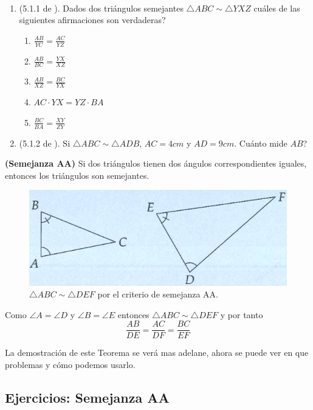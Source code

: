 \begin{exer}{\ \\}
	\begin{enumerate} 
		\item (5.1.1 de \cite{Aops_Geometria}). Dados dos triángulos semejantes $\triangle ABC \sim \triangle YXZ$ cuáles de las siguientes afirmaciones son verdaderas?
		\begin{enumerate}[label=\Alph*)]
			\item $\frac{AB}{YC}=\frac{AC}{YZ}$
			\item$\frac{AB}{BC}=\frac{YX}{XZ}$
			\item $\frac{AB}{XZ}=\frac{BC}{YX}$
			\item $AC\cdot YX = YZ \cdot BA$
			\item $\frac{BC}{BA}=\frac{XY}{ZY}$
		\end{enumerate}
		\item  (5.1.2 de \cite{Aops_Geometria}). Si $\triangle ABC \sim \triangle ADB$, $AC=4cm$ y $AD=9cm$. Cuánto mide $AB$?
	\end{enumerate}
\end{exer}


\begin{theorem} \textbf{(Semejanza AA)}
	Si dos triángulos tienen dos ángulos correspondientes iguales, entonces los triángulos son semejantes. 
	\begin{figure}[H]
		\centering
		\includegraphics[width=0.7\linewidth]{Geometria/imgs/aops_geo_AA_semejanza}
		\caption{$\triangle ABC \sim \triangle DEF$ por el criterio de semejanza AA. }
		\label{teorema_aa_triangulossemejantes}
	\end{figure}
	Como $\angle A = \angle D$ y $\angle B = \angle E$ entonces $\triangle ABC \sim \triangle DEF$ y por tanto
	\[
		\frac{AB}{DE}=\frac{AC}{DF}=\frac{BC}{EF}
	\]
\end{theorem}

La demostración de este Teorema se verá mas adelane, ahora se puede ver en que problemas y cómo podemos usarlo.
\newpage




\begin{center}
	\vspace{-1cm}
	\section{ Ejercicios: Semejanza AA}
\end{center}

